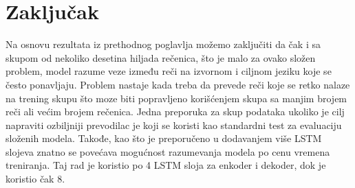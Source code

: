 \documentclass[a4paper]{article}
\begin{document}
\section{Zaključak}

Na osnovu rezultata iz prethodnog poglavlja možemo zaključiti da čak i sa skupom od nekoliko desetina hiljada rečenica, što je malo za ovako složen problem, model razume veze između reči na izvornom i ciljnom jeziku koje se često ponavljaju.
Problem nastaje kada treba da prevede reči koje se retko nalaze na trening skupu što moze biti popravljeno korišćenjem skupa sa manjim brojem reči ali većim brojem rečenica.
Jedna preporuka za skup podataka ukoliko je cilj napraviti ozbiljniji prevodilac je \cite{wmt14} koji se koristi kao standardni test za evaluaciju složenih modela.
Takođe, kao što je preporučeno u \cite{sutskever2014sequence} dodavanjem više LSTM slojeva znatno se povećava mogućnost razumevanja modela po cenu vremena treniranja.
Taj rad je koristio po 4 LSTM sloja za enkoder i dekoder, dok je \cite{wu2016googles} koristio čak 8.

\medskip

\printbibliography
\end{document}
